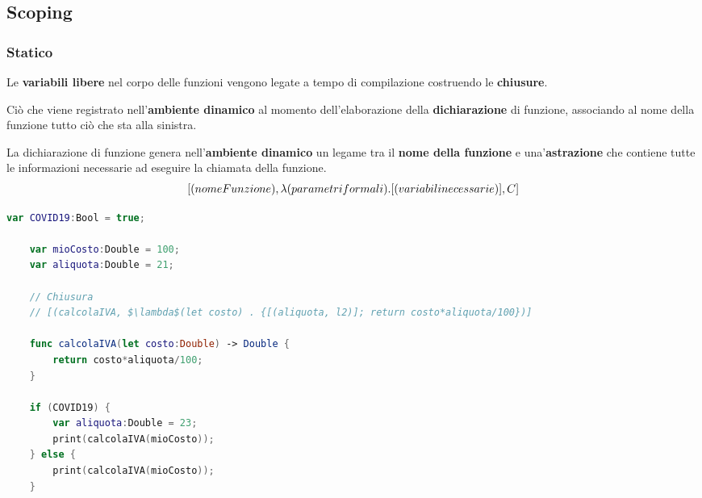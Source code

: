 \subsection{Scoping}
\subsubsection{Statico}
\begin{definition}
	Le \textbf{variabili libere} nel corpo delle funzioni vengono legate a tempo di compilazione costruendo le \textbf{chiusure}.
\end{definition}
\begin{definition}[Chiusura]
	Ciò che viene registrato nell'\textbf{ambiente dinamico} al momento  dell'elaborazione della \textbf{dichiarazione} di funzione, associando al nome della funzione tutto ciò che sta alla sinistra.
\end{definition}
La dichiarazione di funzione genera nell’\textbf{ambiente dinamico} un legame tra il \textbf{nome della funzione} e una'\textbf{astrazione} che contiene tutte le informazioni necessarie ad eseguire la chiamata della funzione.
\begin{align}
	\centering
	[(nomeFunzione), \lambda(parametri formali) . {[(variabili necessarie)], C}]
\end{align}
\begin{lstlisting}[language=Swift, caption=Esempio di scoping statico, mathescape=true]
	var COVID19:Bool = true;
	
	var mioCosto:Double = 100;
	var aliquota:Double = 21;
	
	// Chiusura
	// [(calcolaIVA, $\lambda$(let costo) . {[(aliquota, l2)]; return costo*aliquota/100})]
	
	func calcolaIVA(let costo:Double) -> Double {
		return costo*aliquota/100;
	}

	if (COVID19) {
		var aliquota:Double = 23;
		print(calcolaIVA(mioCosto));
	} else {
		print(calcolaIVA(mioCosto));
	}
\end{lstlisting}
